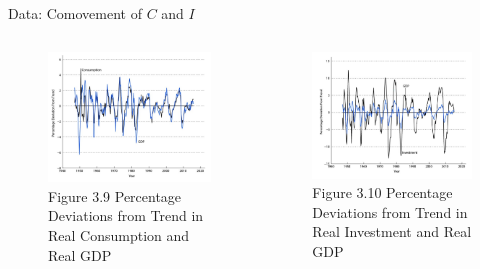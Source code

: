 \documentclass[11pt,aspectratio=43]{beamer}
\theoremstyle{definition}
\begin{document}
\begin{frame}{Data: Comovement of $ C $ and $ I $}
\label{slide:Data__Comovement_of___C___and___I__}

\begin{columns}
    \begin{column}{0.5\textwidth}
        \begin{figure}
            \caption{Figure 3.9 Percentage Deviations from Trend in \alert{Real Consumption} and Real GDP}
            \includegraphics[width=\textwidth]{./figures/Figure3_9.jpg}
        \end{figure}
    \end{column}
    \begin{column}{0.5\textwidth}
        \begin{figure}
            \caption{Figure 3.10 Percentage Deviations from Trend in \alert{Real Investment} and Real GDP}
            \includegraphics[width=\textwidth]{./figures/Figure3_10.jpg}
        \end{figure}
    \end{column}
\end{columns}
\end{frame}
\end{document}

